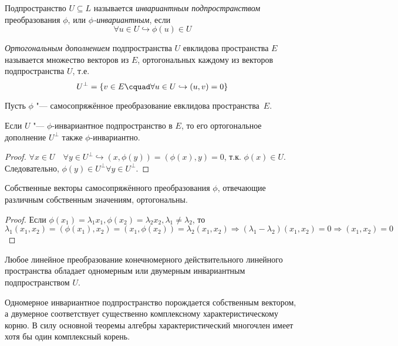   \begin{defn}
  Подпространство $U \subseteq L$ называется \textit{инвариантным подпространством} преобразования $\phi$, или \textit{$\phi$-инвариантным}, если
  \begin{equation}\label{23.1.invariant}
  \forall u \in U \hookrightarrow \phi(u) \in U
  \end{equation}
  \end{defn} 
  
  \begin{defn}
  \textit{Ортогональным дополнением} подпространства $U$ евклидова пространства $E$ называется множество векторов из $E$, ортогональных каждому из векторов подпространства $U$, т.е.
  \begin{equation}\label{23.1.orthogonal}
  U^\perp=\{v \in E\cquad \forall u \in U \hookrightarrow (u,v)=0\}
  \end{equation}
  \end{defn}
  
  Пусть $\phi$ "--- самосопряжённое преобразование евклидова пространства~$E$.
  \begin{stt}\label{23.1.stt_orth}
  Если $U$ "--- $\phi$-инвариантное подпространство в $E$, то его ортогональное дополнение $U^\perp$ также $\phi$-инвариантно.
  \end{stt}
  \begin{proof}
  $\forall x \in U\quad \forall y \in U^\perp \hookrightarrow (x,\phi(y))=(\phi(x),y)=0$, т.к. $\phi(x)\in U$. Следовательно, $\phi(y)\in U^\perp \forall y\in U^\perp$.
  \end{proof}
  
  \begin{stt}
  Собственные векторы самосопряжённого преобразования $\phi$, отвечающие различным собственным значениям, ортогональны.
  \end{stt}
  \begin{proof}
  Если $\phi(x_1)=\lambda_1 x_1, \phi(x_2)=\lambda_2 x_2, \lambda_1 \neq \lambda_2$, то $\lambda_1(x_1,x_2)=(\phi(x_1),x_2)=(x_1,\phi(x_2))=\lambda_2(x_1,x_2) \Rightarrow (\lambda_1-\lambda_2)(x_1,x_2)=0 \Rightarrow (x_1,x_2)=0$
  \end{proof}    
    
  \begin{lemm}\label{23.1.lemm}
  Любое линейное преобразование конечномерного действительного линейного пространства обладает одномерным или двумерным инвариантным подпространством $U$.
  \end{lemm}
  \begin{notion}
  Одномерное инвариантное подпространство порождается собственным вектором, а двумерное соответствует существенно комплексному характеристическому корню. В силу основной теоремы алгебры характеристический многочлен имеет хотя бы один комплексный корень.
  \end{notion}
  
